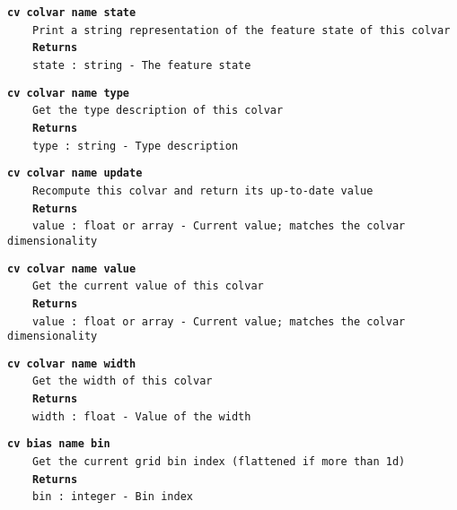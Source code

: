 \begin{mdexampleinput}{}
\texttt{\textbf{cv colvar name state}}
\\
\-~~~~\texttt{Print a string representation of the feature state of this colvar}
\\
\-~~~~\texttt{\textbf{Returns}}
\\
\-~~~~\texttt{state : string - The feature state}
\end{mdexampleinput}
\begin{mdexampleinput}{}
\texttt{\textbf{cv colvar name type}}
\\
\-~~~~\texttt{Get the type description of this colvar}
\\
\-~~~~\texttt{\textbf{Returns}}
\\
\-~~~~\texttt{type : string - Type description}
\end{mdexampleinput}
\begin{mdexampleinput}{}
\texttt{\textbf{cv colvar name update}}
\\
\-~~~~\texttt{Recompute this colvar and return its up-to-date value}
\\
\-~~~~\texttt{\textbf{Returns}}
\\
\-~~~~\texttt{value : float or array - Current value; matches the colvar dimensionality}
\end{mdexampleinput}
\begin{mdexampleinput}{}
\texttt{\textbf{cv colvar name value}}
\\
\-~~~~\texttt{Get the current value of this colvar}
\\
\-~~~~\texttt{\textbf{Returns}}
\\
\-~~~~\texttt{value : float or array - Current value; matches the colvar dimensionality}
\end{mdexampleinput}
\begin{mdexampleinput}{}
\texttt{\textbf{cv colvar name width}}
\\
\-~~~~\texttt{Get the width of this colvar}
\\
\-~~~~\texttt{\textbf{Returns}}
\\
\-~~~~\texttt{width : float - Value of the width}
\end{mdexampleinput}
\begin{mdexampleinput}{}
\texttt{\textbf{cv bias name bin}}
\\
\-~~~~\texttt{Get the current grid bin index (flattened if more than 1d)}
\\
\-~~~~\texttt{\textbf{Returns}}
\\
\-~~~~\texttt{bin : integer - Bin index}
\end{mdexampleinput}
